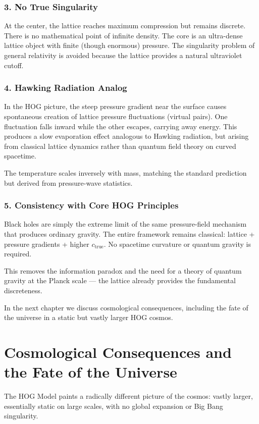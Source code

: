 \documentclass[11pt,a4paper]{book}
\begin{document}
{\subsection{3. No True Singularity}
At the center, the lattice reaches maximum compression but remains discrete. There is no mathematical point of infinite density. The core is an ultra-dense lattice object with finite (though enormous) pressure. The singularity problem of general relativity is avoided because the lattice provides a natural ultraviolet cutoff.

\subsection{4. Hawking Radiation Analog}
In the HOG picture, the steep pressure gradient near the surface causes spontaneous creation of lattice pressure fluctuations (virtual pairs). One fluctuation falls inward while the other escapes, carrying away energy. This produces a slow evaporation effect analogous to Hawking radiation, but arising from classical lattice dynamics rather than quantum field theory on curved spacetime.

The temperature scales inversely with mass, matching the standard prediction but derived from pressure-wave statistics.

\subsection{5. Consistency with Core HOG Principles}
Black holes are simply the extreme limit of the same pressure-field mechanism that produces ordinary gravity. The entire framework remains classical: lattice + pressure gradients + higher \( c_{\text{true}} \). No spacetime curvature or quantum gravity is required.

This removes the information paradox and the need for a theory of quantum gravity at the Planck scale — the lattice already provides the fundamental discreteness.

In the next chapter we discuss cosmological consequences, including the fate of the universe in a static but vastly larger HOG cosmos.

\chapter{Cosmological Consequences and the Fate of the Universe}

The HOG Model paints a radically different picture of the cosmos: vastly larger, essentially static on large scales, with no global expansion or Big Bang singularity.

}
\end{document}
